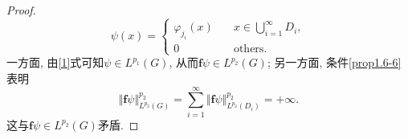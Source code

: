 \begin{proposition}
\begin{proof}
        \begin{equation*}
            \psi(x) = 
            \begin{cases}
                \varphi_{j_i}(x) \quad &x \in \bigcup_{i = 1}^{\infty}D_i, \\ 
                0 \quad &\text{others}.
            \end{cases} 
        \end{equation*}
        一方面, 由\eqref{1}式可知$\psi \in L^{p_1}(G)$, 从而$\bm{f}\psi \in L^{p_2}(G)$; 另一方面, 条件\ref{prop1.6-6}表明 
        \begin{equation*}
            \Vert \bm{f}\psi\Vert_{L^{p_2}(G)}^{p_2} = \sum_{i = 1}^{\infty}\Vert \bm{f}\psi\Vert_{L^{p_2}(D_i)}^{p_2} = +\infty.
        \end{equation*}
        这与$\bm{f}\psi \in L^{p_2}(G)$矛盾.
    \end{proof}
\end{proposition}

